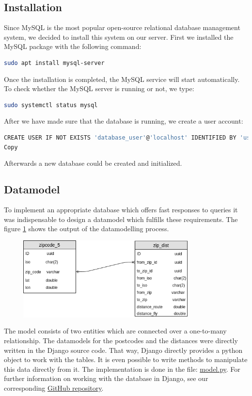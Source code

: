\documentclass[12pt]{article}
\begin{document}
\subsection{Installation}
Since MySQL is the most popular open-source relational database management system, we decided to install this system on our server. 
First we installed the MySQL package with the following command:
\begin{lstlisting}[language=bash,breaklines=true]
sudo apt install mysql-server
\end{lstlisting}
Once the installation is completed, the MySQL service will start automatically. To check whether the MySQL server is running or not, we type:
\begin{lstlisting}[language=bash,breaklines=true]
sudo systemctl status mysql
\end{lstlisting}
After we have made sure that the database is running, we create a user account:
\begin{lstlisting}[language=bash,breaklines=true]
CREATE USER IF NOT EXISTS 'database_user'@'localhost' IDENTIFIED BY 'user_password';
Copy
\end{lstlisting}
Afterwards a new database could be created and initialized.
\subsection{Datamodel}
To implement an appropriate database which offers fast responses to queries it was indispensable to design a datamodel which fulfills these requirements. The figure \ref{pic:er} shows the output of the datamodelling process.
\begin{figure}[H]
\hspace{1.2cm}
\includegraphics[width=0.8\textwidth]{img/er}
\label{pic:er}
\end{figure}
\noindent The model consists of two entities which are connected over a one-to-many relationship.
The datamodels for the postcodes and the distances were directly written in the Django source code. That way, Django directly provides a python object to work with the tables. It is even possible to write methods to manipulate this data directly from it. The implementation is done in the file:
\href{https://github.com/dataBikeHsUlm/WebApp/blob/master/geonom/datamodel/models.py}{model.py}.
For further information on working with the database in Django, see our corresponding 
\href{https://github.com/dataBikeHsUlm/WebApp/blob/master/django_recap.md#database}{GitHub repository}.
\end{document}
